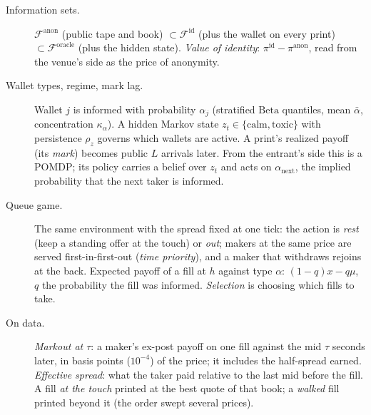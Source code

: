 \documentclass[10pt]{article}
\newcommand{\Fanon}{\mathcal{F}^{\mathrm{anon}}}
\newcommand{\Fid}{\mathcal{F}^{\mathrm{id}}}
\newcommand{\For}{\mathcal{F}^{\mathrm{oracle}}}
\begin{document}
\begin{description}
\item[Information sets.] $\Fanon$ (public tape and book) $\subset\Fid$ (plus the wallet on every print) $\subset\For$ (plus the hidden state). \emph{Value of identity}: $\pi^{\mathrm{id}}-\pi^{\mathrm{anon}}$, read from the venue's side as the price of anonymity.
\item[Wallet types, regime, mark lag.] Wallet $j$ is informed with probability $\alpha_j$ (stratified $\mathrm{Beta}$ quantiles, mean $\bar\alpha$, concentration $\kappa_\alpha$). A hidden Markov state $z_t\in\{\text{calm},\text{toxic}\}$ with persistence $\rho_z$ governs which wallets are active. A print's realized payoff (its \emph{mark}) becomes public $L$ arrivals later. From the entrant's side this is a POMDP; its policy carries a belief over $z_t$ and acts on $\alpha_{\mathrm{next}}$, the implied probability that the next taker is informed.
\item[Queue game.] The same environment with the spread fixed at one tick: the action is \emph{rest} (keep a standing offer at the touch) or \emph{out}; makers at the same price are served first-in-first-out (\emph{time priority}), and a maker that withdraws rejoins at the back. Expected payoff of a fill at $h$ against type $\alpha$: $(1-q)x-q\mu$, $q$ the probability the fill was informed. \emph{Selection} is choosing which fills to take.
\item[On data.] \emph{Markout at $\tau$}: a maker's ex-post payoff on one fill against the mid $\tau$ seconds later, in basis points ($10^{-4}$) of the price; it includes the half-spread earned. \emph{Effective spread}: what the taker paid relative to the last mid before the fill. A fill \emph{at the touch} printed at the best quote of that book; a \emph{walked} fill printed beyond it (the order swept several prices).
\end{description}
\end{document}
